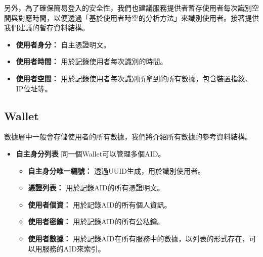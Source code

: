 另外，為了確保簡易登入的安全性，我們也建議服務提供者暫存使用者每次識別空間與對應時間，以便透過「基於使用者時空的分析方法」來識別使用者。接著提供我們建議的暫存資料結構。
\begin{itemize}
  \item \textbf{使用者身分：} 自主憑證明文。
  \item \textbf{使用者時間：} 用於記錄使用者每次識別的時間。
  \item \textbf{使用者空間：} 用於記錄使用者每次識別所拿到的所有數據，包含裝置指紋、IP位址等。
\end{itemize}
\subsection{Wallet}
數據層中一般會存儲使用者的所有數據，我們將介紹所有數據的參考資料結構。
\begin{itemize}
  \item \textbf{自主身分列表} 同一個Wallet可以管理多個AID。
        \begin{itemize}
          \item \textbf{自主身分唯一編號：} 透過UUID生成，用於識別使用者。
          \item \textbf{憑證列表：} 用於記錄AID的所有憑證明文。
          \item \textbf{使用者個資：} 用於記錄AID的所有個人資訊。
          \item \textbf{使用者密鑰：} 用於記錄AID的所有公私鑰。
          \item \textbf{使用者數據：} 用於記錄AID在所有服務中的數據，以列表的形式存在，可以用服務的AID來索引。
        \end{itemize}
\end{itemize}
